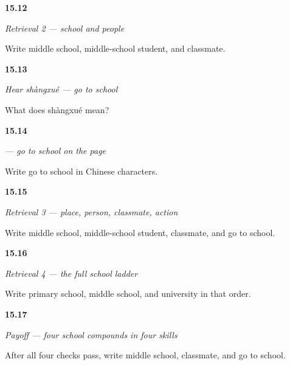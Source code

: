 \noindent\begin{minipage}[t]{\linewidth}
\raggedright
\hypertarget{review-ZH-R15-school-map-2-recall}{\textbf{15.12}} \emph{Retrieval 2 — school and people}\par
\small Write middle school, middle-school student, and classmate.
\end{minipage}\par\medskip

\noindent\begin{minipage}[t]{\linewidth}
\raggedright
\hypertarget{review-ZH-C15-hear-shangxue-meaning}{\textbf{15.13}} \emph{Hear \emph{shàngxué} — go to school}\par
\small What does shàngxué mean?
\end{minipage}\par\medskip

\noindent\begin{minipage}[t]{\linewidth}
\raggedright
\hypertarget{review-ZH-C15-shangxue-write}{\textbf{15.14}} \emph{ — go to school on the page}\par
\small Write go to school in Chinese characters.
\end{minipage}\par\medskip

\noindent\begin{minipage}[t]{\linewidth}
\raggedright
\hypertarget{review-ZH-R15-school-map-3-recall}{\textbf{15.15}} \emph{Retrieval 3 — place, person, classmate, action}\par
\small Write middle school, middle-school student, classmate, and go to school.
\end{minipage}\par\medskip

\noindent\begin{minipage}[t]{\linewidth}
\raggedright
\hypertarget{review-ZH-R15-school-map-4-recall}{\textbf{15.16}} \emph{Retrieval 4 — the full school ladder}\par
\small Write primary school, middle school, and university in that order.
\end{minipage}\par\medskip

\noindent\begin{minipage}[t]{\linewidth}
\raggedright
\hypertarget{review-ZH-C15-practice-school-payoff}{\textbf{15.17}} \emph{Payoff — four school compounds in four skills}\par
\small After all four checks pass, write middle school, classmate, and go to school.
\end{minipage}\par\medskip

